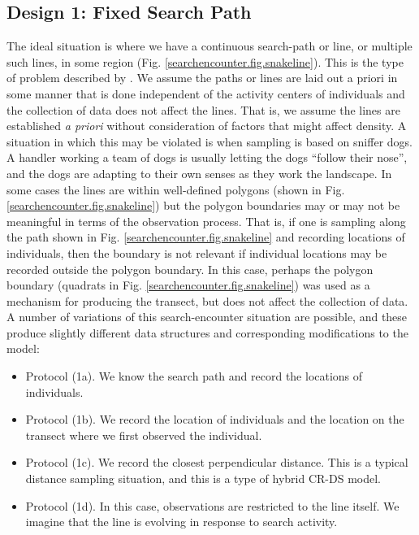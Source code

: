 \subsection{Design 1: Fixed Search Path}
\label{searchencounter.sec.fixedpath}

The ideal situation is where we have a continuous search-path or
line, or multiple such lines, in some region
(Fig. \ref{searchencounter.fig.snakeline}). This is the type of
problem described by \citet{royle_etal:2011mee}. We assume the paths or
lines are laid out a priori in some manner that is done independent of
the activity centers of individuals and the collection of data does
not affect the lines.  That is, we assume the lines are established
{\it a priori} without consideration of factors that might affect
density. A situation in which this may be violated is when sampling is
based on sniffer dogs. A handler working a team of dogs is usually
letting the dogs ``follow their nose'', and the dogs are adapting to
their own senses as they work the landscape. 
In some cases the lines are within well-defined
polygons (shown in Fig. \ref{searchencounter.fig.snakeline}) but the
polygon boundaries may or may not be meaningful in terms of the
observation process. That is, if one is sampling along the path shown
in Fig. \ref{searchencounter.fig.snakeline} and recording locations of
individuals, then the boundary is not relevant if individual locations
may be recorded outside the polygon boundary. In this case, perhaps
the polygon boundary (quadrats in
Fig. \ref{searchencounter.fig.snakeline}) was used as a mechanism for
producing the transect, but does not affect the collection of data.  A
number of variations of this search-encounter situation are possible,
and these produce slightly different data structures and corresponding
modifications to the model:
\begin{itemize}
 \item[] Protocol (1a). We know the search path and record the locations of individuals.
 \item[] Protocol (1b). We record the location of individuals and
   the location on the transect where we first observed the individual.
 \item[] Protocol (1c). We record
the closest perpendicular distance. This is a typical
   distance sampling situation, and this is a type of hybrid CR-DS model.
 \item[] Protocol (1d). In this case, observations are restricted to
   the line itself. We imagine that the line is evolving in response
   to search activity. 
 \end{itemize}


